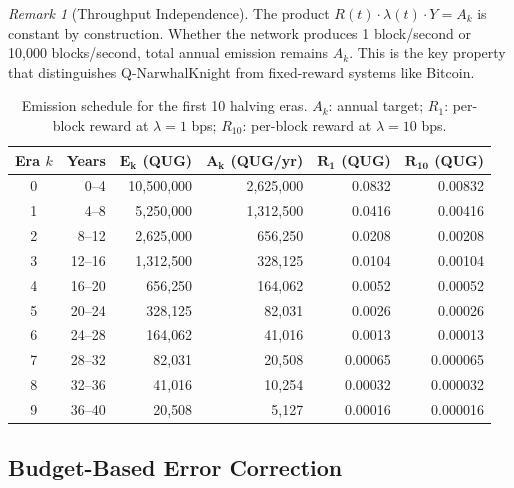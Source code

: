 \documentclass[11pt,a4paper]{article}
\theoremstyle{definition}
\theoremstyle{remark}
\newtheorem{remark}[theorem]{Remark}
\newcommand{\QNK}{\textsf{Q-NarwhalKnight}}
\newcommand{\reward}{R}
\newcommand{\blockrate}{\lambda}
\begin{document}
\begin{remark}[Throughput Independence]\label{rem:throughput}
The product $\reward(t) \cdot \blockrate(t) \cdot Y = A_k$ is constant
by construction.
Whether the network produces 1 block/second or 10{,}000 blocks/second,
total annual emission remains $A_k$.
This is the key property that distinguishes \QNK{} from fixed-reward
systems like Bitcoin.
\end{remark}

\begin{table}[t]
\centering
\caption{Emission schedule for the first 10 halving eras.
$A_k$: annual target; $R_1$: per-block reward at $\blockrate = 1$ bps;
$R_{10}$: per-block reward at $\blockrate = 10$ bps.}
\label{tab:emission}
\begin{tabular}{@{}crrrrr@{}}
\toprule
\textbf{Era} $k$ & \textbf{Years} & $\boldsymbol{E_k}$ \textbf{(QUG)} &
$\boldsymbol{A_k}$ \textbf{(QUG/yr)} & $\boldsymbol{R_1}$ \textbf{(QUG)} &
$\boldsymbol{R_{10}}$ \textbf{(QUG)} \\
\midrule
0  & 0--4   & 10{,}500{,}000     & 2{,}625{,}000     & 0.0832 & 0.00832 \\
1  & 4--8   & 5{,}250{,}000      & 1{,}312{,}500      & 0.0416 & 0.00416 \\
2  & 8--12  & 2{,}625{,}000      & 656{,}250          & 0.0208 & 0.00208 \\
3  & 12--16 & 1{,}312{,}500      & 328{,}125          & 0.0104 & 0.00104 \\
4  & 16--20 & 656{,}250          & 164{,}062          & 0.0052 & 0.00052 \\
5  & 20--24 & 328{,}125          & 82{,}031           & 0.0026 & 0.00026 \\
6  & 24--28 & 164{,}062          & 41{,}016           & 0.0013 & 0.00013 \\
7  & 28--32 & 82{,}031           & 20{,}508           & 0.00065 & 0.000065 \\
8  & 32--36 & 41{,}016           & 10{,}254           & 0.00032 & 0.000032 \\
9  & 36--40 & 20{,}508           & 5{,}127            & 0.00016 & 0.000016 \\
\bottomrule
\end{tabular}
\end{table}

\subsection{Budget-Based Error Correction}
\end{document}
